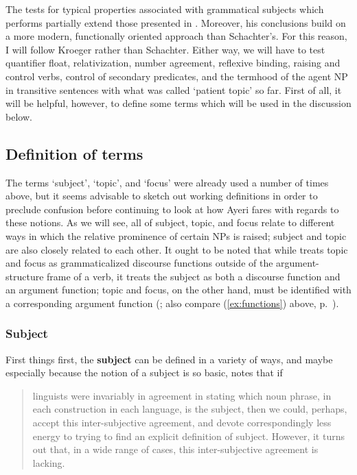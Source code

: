 The tests for typical properties associated with grammatical subjects which
\citet{kroeger1991} performs partially extend those presented in
\citet{schachter1976}. Moreover, his conclusions build on a more modern,
functionally oriented approach than Schachter's. For this reason, I will follow
Kroeger rather than Schachter. Either way, we will have to test quantifier
float, relativization, number agreement, reflexive binding, raising and control
verbs, control of secondary predicates, and the termhood of the agent NP in
transitive sentences with what was called `patient topic' so far. First of all,
it will be helpful, however, to define some terms which will be used in the
discussion below.

\subsection{Definition of terms}

The terms `subject', `topic', and `focus' were already used a number of times
above, but it seems advisable to sketch out working definitions in order to
preclude confusion before continuing to look at how Ayeri fares with regards to
these notions. As we will see, all of subject, topic, and focus relate to
different ways in which the relative prominence of certain NPs is raised;
subject and topic are also closely related to each other. It ought to be noted
that while \Lfg{} treats topic and focus as grammaticalized discourse functions
outside of the argument-structure frame of a verb, it treats the subject as
both a discourse function and an argument function; topic and focus, on the
other hand, must be identified with a corresponding argument function
(\cite[99--100]{bresnan2016}; also compare (\ref{ex:functions}) above,
p.~\pageref{ex:functions}).

\subsubsection{Subject}

First things first, the \textbf{subject} can be defined in a variety of ways,
and maybe especially because the notion of a subject is so basic,
\citet{comrie1989} notes that if

\blockcquote[104]{comrie1989}{linguists were invariably in agreement in stating
which noun phrase, in each construction in each language, is the subject, then
we could, perhaps, accept this inter-subjective agreement, and devote
correspondingly less energy to trying to find an explicit definition of
subject. However, it turns out that, in a wide range of cases, this
inter-subjective agreement is lacking.}

